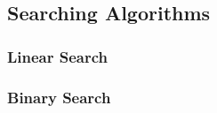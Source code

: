 \subsection{Searching Algorithms}
    \subsubsection{Linear Search}
    \subsubsection{Binary Search}